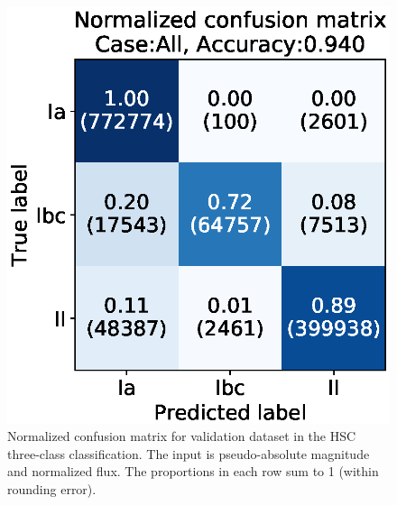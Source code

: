 \documentclass[useamsfonts]{pasj01}
\begin{document}
%
%
\begin{figure}[htbp]
  \begin{center}
     \includegraphics[width=\columnwidth]{figures/13_CM_abs-mag_scaled-flux_w-mixup_remove-y_predictions_validation_2_Flagall_weighted.eps}
  \end{center}
  \caption{%
  Normalized confusion matrix for validation dataset in the HSC three-class classification.
  The input is pseudo-absolute magnitude and normalized flux.
  The proportions in each row sum to 1 (within rounding error).
  }%
  \label{fig:h3_validation_CM}
\end{figure}
%
%
\end{document}
